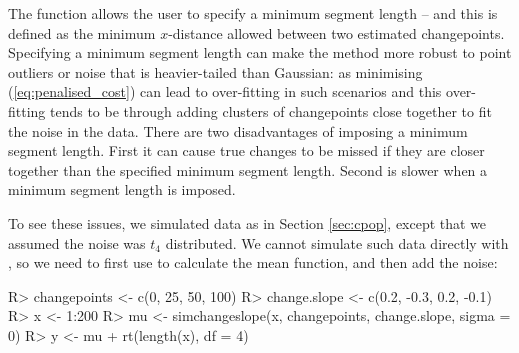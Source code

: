\documentclass[article]{jss}
\begin{document}
The  function allows the user to specify a minimum segment length -- and this is defined as the minimum $x$-distance allowed between two estimated changepoints. Specifying a minimum segment length can make the method more robust to point outliers or noise that is heavier-tailed than Gaussian: as minimising (\ref{eq:penalised_cost}) can lead to over-fitting in such scenarios and this over-fitting tends to be through adding clusters of changepoints close together to fit the noise in the data. There are two disadvantages of imposing a minimum segment length. First it can cause true changes to be missed if they are closer together than the specified minimum segment length. Second  is slower when a minimum segment length is imposed.

To see these issues, we simulated data as in Section \ref{sec:cpop}, except that we assumed the noise was $t_4$ distributed. We cannot simulate such data directly with , so we need to first use  to calculate the mean function, and then add the noise:

\begin{CodeChunk}
\begin{CodeInput}
R> changepoints <- c(0, 25, 50, 100)
R> change.slope <- c(0.2, -0.3, 0.2, -0.1)
R> x <- 1:200
R> mu <- simchangeslope(x, changepoints, change.slope, sigma = 0)
R> y <- mu + rt(length(x), df = 4)
\end{CodeInput}
\end{CodeChunk}
\end{document}
